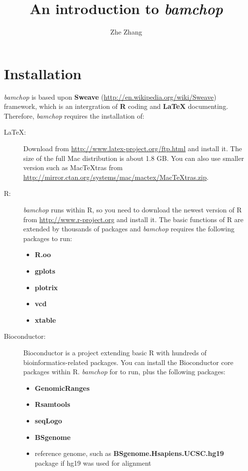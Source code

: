 \documentclass{article}
\begin{document}
\begin{titlepage}
\title{An introduction to \textit{bamchop}}
\author{Zhe Zhang}
\maketitle
\tableofcontents
\end{titlepage}

\section{Installation}

\textit{bamchop} is based upon \textbf{Sweave} (\url{http://en.wikipedia.org/wiki/Sweave}) framework, which is an intergration of \textbf{R} coding and \textbf{LaTeX} documenting. Therefore, \textit{bamchop} requires the installation of:

\begin{description}
\item[LaTeX:] Download from \url{http://www.latex-project.org/ftp.html} and install it. The size of the full Mac distribution is about 1.8 GB. You can also use smaller version such as MacTeXtras from \url{http://mirror.ctan.org/systems/mac/mactex/MacTeXtras.zip}. 
\item[R:] \textit{bamchop} runs within R, so you need to download the newest version of R from \url{http://www.r-project.org} and install it. The basic functions of R are extended by thousands of packages and \textit{bamchop} requires the following packages to run:
  \begin{itemize}
  \item \textbf{R.oo}
  \item \textbf{gplots}
  \item \textbf{plotrix}
  \item \textbf{vcd}
  \item \textbf{xtable}
	\end{itemize}
\item[Bioconductor:] Bioconductor is a project extending basic R with hundreds of bioinformatics-related packages. You can install the Bioconductor core packages within R. \textit{bamchop}  for  to run, plus the following packages:
  \begin{itemize}
  \item \textbf{GenomicRanges}
  \item \textbf{Rsamtools}
  \item \textbf{seqLogo}
  \item \textbf{BSgenome}
  \item reference genome, such as \textbf{BSgenome.Hsapiens.UCSC.hg19} package if hg19 was used for alignment
  \end{itemize}
\end{description}
\end{document}
